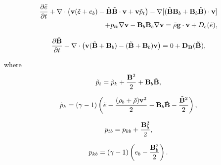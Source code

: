 \begin{eqnarray}\label{eqpe}\nonumber
{{\partial \tilde{e}}\over{\partial t}}+\nabla\cdot\left({\bf v}(\tilde{e}+e_{b})-{\tilde{\bf B} \tilde{\bf B}}\cdot{\bf v}+{\bf v}\tilde{p}_{t}\right)-\nabla [(\tilde{\bf B}{\bf B}_{b}+{\bf B}_{b}\tilde{\bf B})\cdot\bf v]\\
+p_{tb}\nabla {\bf v}-{\bf B}_{b}{\bf B}_{b}\nabla {\bf v}=\tilde{\rho}{\bf g}\cdot{\bf v}+D_{e}(\tilde{e}),
\end{eqnarray}

\begin{equation}\label{eqpb}
{{\partial\tilde{{\bf B}}}\over{\partial t}} +\nabla \cdot\left(  {\bf v}(\tilde{ \bf B} + {\bf B}_b)-(\tilde{ \bf B} + {\bf B}_b){\bf v}\right)=0+\bf{D}_{B}(\tilde{\bf B}),
\end{equation}


where
\begin{equation}\label{eqppt}
\tilde{p}_{t}=\tilde{p}_{k}+{{{\bf B}^{2}}\over{2}}+{\bf B}_{b}\tilde{\bf B},
\end{equation}

\begin{equation}\label{eqppk}
\tilde{p}_{k}=(\gamma -1)\left(\tilde{e}-{{(\rho_{b}+\tilde{\rho}){\bf v}^2}\over{2}}-{\bf B}_{b}\tilde{\bf B}-{{\tilde{\bf B}^{2}}\over{2}}\right),
\end{equation}

\begin{equation}
p_{tb}=p_{kb}+{{{\bf B}_{b}^{2}}\over{2}},
\end{equation}

\begin{equation}\label{eqppkb}
p_{kb}=(\gamma -1)\left(e_{b}-{{{\bf B}_{b}^2}\over{2}}    \right).
\end{equation}

